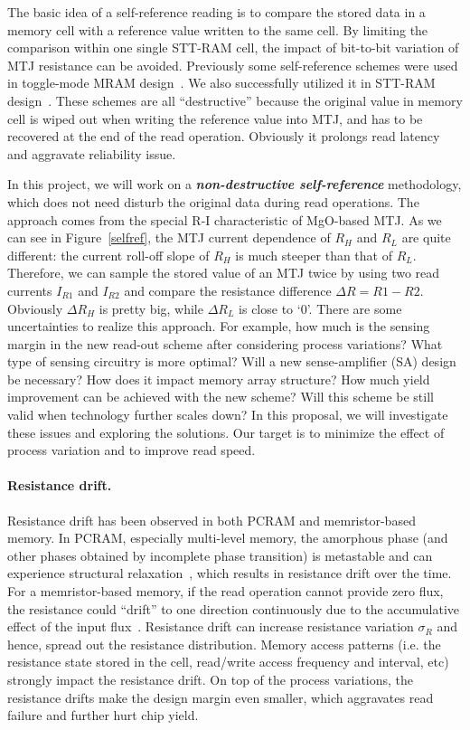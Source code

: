 The basic idea of a self-reference reading is to compare the stored data in a memory cell with a reference value written to the same cell. By limiting the comparison within one single STT-RAM cell, the impact of bit-to-bit variation of MTJ resistance can be avoided. Previously some self-reference schemes were used in toggle-mode MRAM design~\cite{MRAM:TTO+06,Jeong03}. We also successfully utilized it in STT-RAM design~\cite{Li:147723}. These schemes are all ``destructive'' because the original value in memory cell is wiped out when writing the reference value into MTJ, and has to be recovered at the end of the read operation. Obviously it prolongs read latency and aggravate reliability issue.

In this project, we will work on a \textbf{\textit{non-destructive self-reference}} methodology, which does not need disturb the original data during read operations. The approach comes from the special R-I characteristic of MgO-based MTJ. As we can see in Figure~\ref{selfref}, the MTJ current dependence of $R_H$ and $R_L$ are quite different: the current roll-off slope of $R_H$ is much steeper than that of $R_L$. Therefore, we can sample the stored value of an MTJ twice by using two read currents $I_{R1}$ and $I_{R2}$ and compare the resistance difference ${\Delta}R=R1-R2$. Obviously ${\Delta}R_H$ is pretty big, while ${\Delta}R_L$ is close to `0'.
There are some uncertainties to realize this approach. For example, how much is the sensing margin in the new read-out scheme after considering process variations? What type of sensing circuitry is more optimal? Will a new sense-amplifier (SA) design be necessary? How does it impact memory array structure? How much yield improvement can be achieved with the new scheme? Will this scheme be still valid when technology further scales down? In this proposal, we will investigate these issues and exploring the solutions. Our target is to minimize the effect of process variation and to improve read speed.

\paragraph{Resistance drift.} Resistance drift has been observed in both PCRAM and memristor-based memory. In PCRAM, especially multi-level memory, the amorphous phase (and other phases obtained by incomplete phase transition) is metastable and can experience structural relaxation~\cite{Pirovano04}, which results in resistance drift over the time. For a memristor-based memory, if the read operation cannot provide zero flux, the resistance could ``drift'' to one direction continuously due to the accumulative effect of the input flux~\cite{Ho09}. Resistance drift can increase resistance variation $\sigma_R$ and hence, spread out the resistance distribution. Memory access patterns (i.e. the resistance state stored in the cell, read/write access frequency and interval, etc) strongly impact the resistance drift. On top of the process variations, the resistance drifts make the design margin even smaller, which aggravates read failure and further hurt chip yield.


